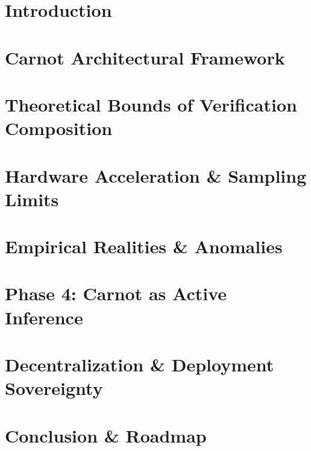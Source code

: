 \begin{abstract}Abstract text.\end{abstract}
\section{Introduction}
\section{Carnot Architectural Framework}
\section{Theoretical Bounds of Verification Composition}
\section{Hardware Acceleration \& Sampling Limits}
\section{Empirical Realities \& Anomalies}
\section{Phase 4: Carnot as Active Inference}
\section{Decentralization \& Deployment Sovereignty}
\section{Conclusion \& Roadmap}
